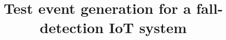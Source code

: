 \documentclass[journal]{IEEEtran}
\begin{document}
%
\title{Test event generation for a fall-detection IoT system}




% 
\end{document}
